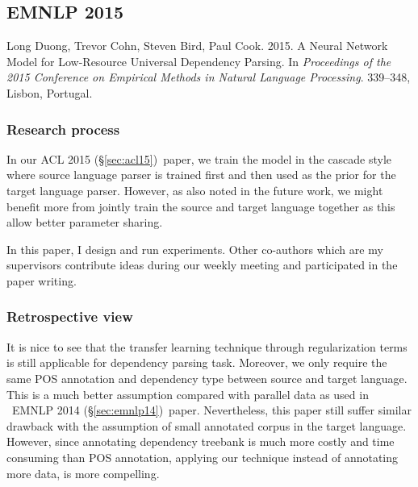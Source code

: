 \documentclass[12pt,twoside,final,hidelinks]{ltthesis}
\theoremstyle{definition}
\newcommand\emnlpiv{EMNLP 2014 (\S\ref{sec:emnlp14})}
\newcommand\aclv{ACL 2015 (\S\ref{sec:acl15})}
\begin{document}



\subsection{EMNLP 2015}
\label{sec:emnlp15}

Long Duong, Trevor Cohn, Steven Bird, Paul Cook. 2015. A Neural Network Model for Low-Resource Universal Dependency Parsing. In \textit{Proceedings of the 2015 Conference on Empirical Methods in Natural Language Processing}. 339--348, Lisbon, Portugal.

\subsubsection{Research process}
In our \aclv\ paper, we train the model in the cascade style where source language parser is trained first and then used as the prior for the target language 
parser. However, as also noted in the future work, we might benefit more from jointly train the source and target language together as this allow better 
parameter sharing. 

In this paper, I design and run experiments. Other co-authors which are my supervisors contribute ideas during our weekly 
meeting and participated in the paper writing. 

\subsubsection{Retrospective view}
It is nice to see that the transfer learning technique through regularization terms is still applicable for dependency parsing task. Moreover, we only 
require the same POS annotation and dependency type between source and target language. This is a much better 
assumption compared with parallel data as used in ~\emnlpiv\ paper. Nevertheless, this paper still suffer similar drawback with the assumption of 
small annotated corpus in the target language. However, since annotating dependency treebank is much more costly and time consuming than POS annotation, 
applying our technique instead of annotating more data, is more compelling.  





\end{document}

